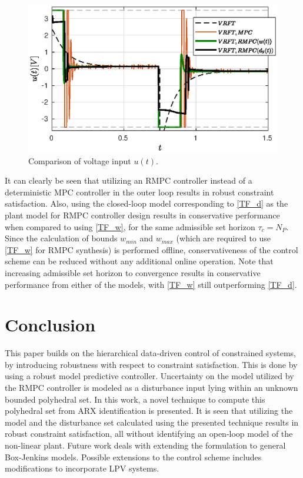 \documentclass[letterpaper, 10 pt, conference]{ieeeconf}  %
\begin{document}
	\begin{figure}[t]
		\hspace{-5pt}
		\includegraphics[scale = 0.60]{VRFT_vs_MPC_u.eps}
		\caption{Comparison of voltage input $u(t)$.}
		\label{VRFT_u}
	\end{figure} 
	It can clearly be seen that utilizing an RMPC controller instead of a deterministic MPC controller in the outer loop results in robust constraint satisfaction. Also, using the closed-loop model corresponding to \eqref{TF_d} as the plant model for RMPC controller design results in conservative performance when compared to using \eqref{TF_w}, for the same admissible set horizon $\tau_c = N_P$. Since the calculation of bounds $w_{min}$ and $w_{max}$ (which are required to use \eqref{TF_w} for RMPC synthesis) is performed offline, conservativeness of the control scheme can be reduced without any additional online operation. Note that increasing admissible set horizon to convergence results in conservative performance from either of the models, with \eqref{TF_w} still outperforming \eqref{TF_d}. 
	
	\section{Conclusion}
	This paper builds on the hierarchical data-driven control of constrained systems, by introducing robustness with respect to constraint satisfaction. This is done by using a robust model predictive controller.  Uncertainty on the model utilized by the RMPC controller is modeled as a disturbance input lying within an unknown bounded polyhedral set. 
	In this work, a novel technique to compute this polyhedral set from ARX identification is presented. It is seen that utilizing the model and the disturbance set calculated using the presented technique results in robust constraint satisfaction, all without identifying an open-loop model of the non-linear plant. Future work deals with extending the formulation to general Box-Jenkins models. Possible extensions to the control scheme includes modifications to incorporate LPV systems.

	
                                                             

\end{document}
